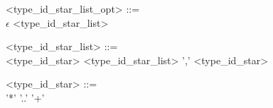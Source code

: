 
\begin{minipage}{6in}
\begin{blue}
\begin{grammar}
  <type_id_star_list_opt> ::= \hspace{1in} \\
     $\epsilon$ 
\alt <type_id_star_list>

<type_id_star_list> ::=  \hspace{1in} \\
      <type_id_star> 
\alt  <type_id_star_list> ',' <type_id_star>

<type_id_star> ::=  \hspace{1in} \\
    '*' 
\alt '..' 
 '+' 
\end{grammar} 
\end{blue}
\end{minipage}

